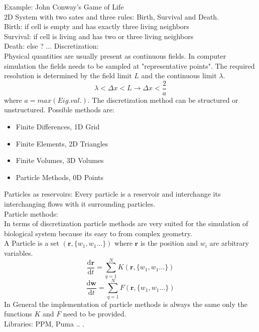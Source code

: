 \documentclass[hyperref]{labbook}
\numberwithin{equation}{experiment}
\numberwithin{table}{experiment}
\numberwithin{figure}{experiment}
\begin{document}
Example: John Conway's Game of Life\\
2D System with two sates and three rules: Birth, Survival and Death. \\
Birth: if cell is empty and has exactly three living neighbors  \\
Survival: if cell is living and has two or three living neighbors \\
Death: else ?    ... 
\newpage
{}
Discretization: \\
Physical quantities are usually present as continuous fields. In computer simulation the fields needs to be sampled at "representative points". The required resolution is determined by the field limit $L$ and the continuous limit $\lambda$.
\begin{equation}
\lambda < \Delta x < L  \rightarrow \Delta x < \frac{2}{a}
\end{equation}
where $a = max(Eig.val.)$. The discretization method can be structured or unstructured. Possible methods are:
\begin{itemize}
\item Finite Differences, 1D Grid
\item Finite Elements,  2D Triangles
\item Finite Volumes, 3D Volumes 
\item Particle Methods, 0D Points
\end{itemize}
Particles as reservoirs: Every particle is a reservoir and interchange its interchanging flows with it surrounding particles. \\[1em]
Particle methods:\\
In terms of discretization particle methods are very suited for the simulation of biological system because its easy to from complex geometry.\\ 
A Particle is a set $(\mathbf{r}, \{ w_1 , w_1 \dots \})$ where $\mathbf{r}$ is the position and $w_i$ are arbitrary variables. 
\begin{equation}
\frac{\mathrm{d}\mathbf{r}}{\mathrm{d}t}  =  \sum_{q = 1}^N K(\mathbf{r}, \{ w_1 , w_1 \dots \})
\end{equation}
\begin{equation}
\frac{\mathrm{d}\mathbf{w}}{\mathrm{d}t} = \sum_{q = 1}^N F(\mathbf{r}, \{ w_1 , w_1 \dots \})
\end{equation}
In General the implementation of particle methods is always the same only the functions $K$ and $F$ need to be provided. \\
Libraries: PPM, Puma .. .\\[1em]
\end{document}
